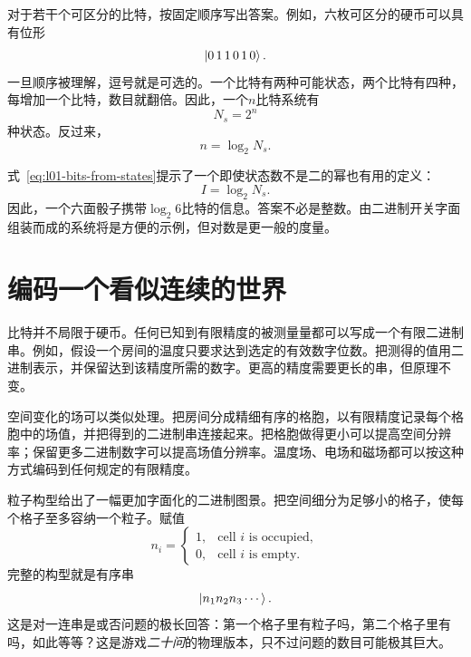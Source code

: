 对于若干个可区分的比特，按固定顺序写出答案。例如，六枚可区分的硬币可以具有位形
\begin{equation}
  \left\lvert0\,1\,1\,0\,1\,0\right\rangle.
\end{equation}
一旦顺序被理解，逗号就是可选的。一个比特有两种可能状态，两个比特有四种，每增加一个比特，数目就翻倍。因此，一个\(n\)比特系统有
\begin{equation}
  N_s=2^n
  \label{eq:l01-state-count}
\end{equation}
种状态。反过来，
\begin{equation}
  n=\log_2 N_s.
  \label{eq:l01-bits-from-states}
\end{equation}

式~\eqref{eq:l01-bits-from-states}提示了一个即使状态数不是二的幂也有用的定义：
\begin{equation}
  I=\log_2 N_s.
  \label{eq:l01-information}
\end{equation}
因此，一个六面骰子携带\(\log_2 6\)比特的信息。答案不必是整数。由二进制开关字面组装而成的系统将是方便的示例，但对数是更一般的度量。

\section{编码一个看似连续的世界}

比特并不局限于硬币。任何已知到有限精度的被测量量都可以写成一个有限二进制串。例如，假设一个房间的温度只要求达到选定的有效数字位数。把测得的值用二进制表示，并保留达到该精度所需的数字。更高的精度需要更长的串，但原理不变。

空间变化的场可以类似处理。把房间分成精细有序的格胞，以有限精度记录每个格胞中的场值，并把得到的二进制串连接起来。把格胞做得更小可以提高空间分辨率；保留更多二进制数字可以提高场值分辨率。温度场、电场和磁场都可以按这种方式编码到任何规定的有限精度。

粒子构型给出了一幅更加字面化的二进制图景。把空间细分为足够小的格子，使每个格子至多容纳一个粒子。赋值
\begin{equation}
  n_i=
  \begin{cases}
    1,&\text{cell \(i\) is occupied},\\
    0,&\text{cell \(i\) is empty}.
  \end{cases}
  \label{eq:l01-occupancy-bit}
\end{equation}
完整的构型就是有序串
\begin{equation}
  \left\lvert n_1n_2n_3\cdots\right\rangle.
\end{equation}
这是对一连串是或否问题的极长回答：第一个格子里有粒子吗，第二个格子里有吗，如此等等？这是游戏\emph{二十问}的物理版本，只不过问题的数目可能极其巨大。

